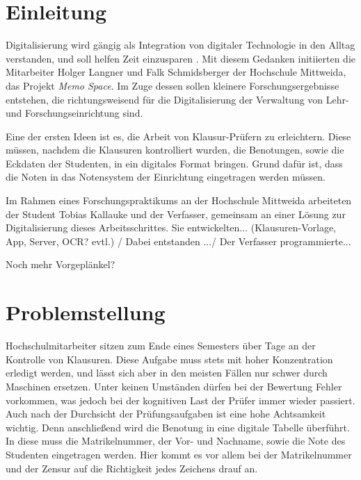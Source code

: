 \documentclass[nomenclature, 150]{HSMW-Thesis}
\begin{document}
\begin{Referat}
\end{Referat}


\Hauptteil


\chapter{Einleitung}
	Digitalisierung wird gängig als Integration von digitaler Technologie in den Alltag verstanden, und soll helfen Zeit einzusparen \cite{digital}. Mit diesem Gedanken initiierten die Mitarbeiter Holger Langner und Falk Schmidsberger der Hochschule Mittweida, das Projekt \textit{Memo Space}. Im Zuge dessen sollen kleinere Forschungsergebnisse entstehen, die richtungsweisend für die Digitalisierung der Verwaltung von Lehr- und Forschungseinrichtung sind.

	Eine der ersten Ideen  ist es, die Arbeit von Klausur-Prüfern zu erleichtern. Diese müssen, nachdem die Klausuren kontrolliert wurden, die Benotungen, sowie die Eckdaten der Studenten, in ein digitales Format bringen. Grund dafür ist, dass die Noten in das Notensystem der Einrichtung eingetragen werden müssen. 

	Im Rahmen eines Forschungspraktikums an der Hochschule Mittweida arbeiteten der Student Tobias Kallauke und der Verfasser, gemeinsam an einer Lösung zur Digitalisierung dieses Arbeitsschrittes. Sie entwickelten... (Klausuren-Vorlage, App, Server, OCR? evtl.) / Dabei entstanden .../ Der Verfasser programmierte...
	
	Noch mehr Vorgeplänkel?  





\chapter{Problemstellung} 
	Hochschulmitarbeiter sitzen zum Ende eines Semesters über Tage an der Kontrolle von Klausuren. Diese Aufgabe muss stets mit hoher Konzentration erledigt werden, und lässt sich aber in den meisten Fällen nur schwer durch Maschinen ersetzen. Unter keinen Umständen dürfen bei der Bewertung Fehler vorkommen, was jedoch bei der kognitiven Last der Prüfer immer wieder passiert. Auch nach der Durchsicht der Prüfungsaufgaben ist eine hohe Achtsamkeit wichtig. Denn anschließend wird die Benotung in eine digitale Tabelle überführt. In diese muss die Matrikelnummer, der Vor- und Nachname, sowie die Note des Studenten eingetragen werden. Hier kommt es vor allem bei der Matrikelnummer und der Zensur auf die Richtigkeit jedes Zeichens drauf an. 
	
\end{document}
